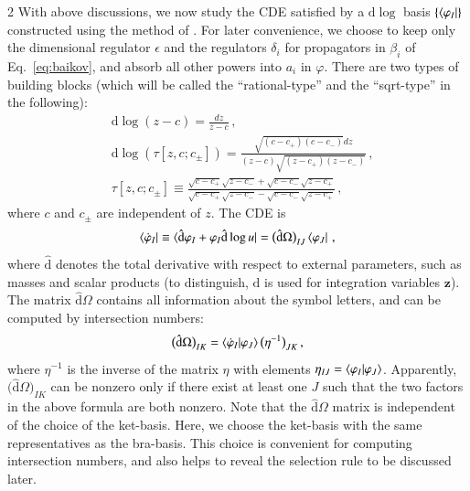 \documentclass[fleqn]{2023SCGE}
\newcommand{\nn}{\nonumber}
\newcommand{\nd}{\mathrm{d}}
\newcommand{\nds}{\hat{\mathrm{d}}}
\begin{document}
\begin{multicols}{2}
With above discussions, we now study the CDE satisfied by a $\nd\log$ basis $\{\bra{\varphi_I}\}$ constructed using the method of \cite{Chen:2020uyk,Chen:2022lzr}.
For later convenience, we choose to keep only the dimensional regulator $\epsilon$ and the  regulators $\delta_i$ for propagators in $\beta_i$ of Eq.~\eqref{eq:baikov}, and absorb all other powers into $a_i$ in $\varphi$. There are two types of building blocks (which will be called the ``rational-type'' and the ``sqrt-type'' in the following):
\begin{align}
	&\nd \log(z-c) = \frac{d z}{z-c}\,, \nn \\
	&\nd \log(\tau[z,c;c_{\pm}]) = \frac{\sqrt{(c-c_+)(c-c_-)}d z}{(z-c)\sqrt{(z-c_+)(z-c_-)}} \,,\nn\\
	&{  \tau[z,c;c_{\pm}]} \equiv \frac{\sqrt{c-c_+} \sqrt{z-c_-}+\sqrt{c-c_-} \sqrt{z-c_+}}{\sqrt{c-c_+}
		\sqrt{z-c_-}-\sqrt{c-c_-} \sqrt{z-c_+}}\,,\label{eq:dlog_basis}
\end{align}
where $c$ and $c_\pm$ are independent of $z$.
The CDE is
\begin{equation}
	\bra{\dot{\varphi}_I} \equiv {  \bra{\nds\varphi_I+ \varphi_I \nds\log u} } = \big( \nds \Omega \big)_{IJ} \bra{\varphi_J} \,,
\end{equation}
where $\nds$ denotes the total derivative with respect to external parameters, such as masses and scalar products (to distinguish, $\nd$ is used for integration variables $\bm{z}$). The matrix $\nds \Omega$ contains all information about the symbol letters, and can be computed by intersection numbers:
\begin{equation}
    \big( \nds \Omega \big)_{IK} = \braket{\dot{\varphi}_I|\varphi_J} \big( \eta^{-1} \big)_{JK} \, ,
    \label{eq:intnumDE}
\end{equation}
where $\eta^{-1}$ is the inverse of the matrix $\eta$ with elements $\eta_{IJ}=\braket{\varphi_I|\varphi_J}$. Apparently, $\big( \nds \Omega \big)_{IK}$ can be nonzero only if there exist at least one $J$ such that the two factors in the above formula are both nonzero.
{  Note that the $\nds \Omega$ matrix is independent of the choice of the ket-basis. Here, we choose the ket-basis with the same representatives as the bra-basis. This choice is convenient for computing intersection numbers, and also helps to reveal the selection rule to be discussed later.}


\end{multicols}
\end{document}
